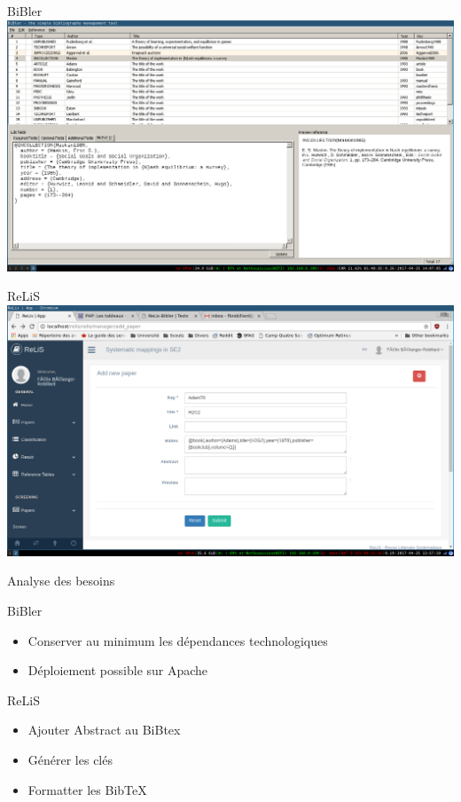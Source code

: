 \documentclass{beamer}
\begin{document}
\begin{frame}{BiBler}
\includegraphics[width=\linewidth,height=\textheight,keepaspectratio]{bibler.png}
\end{frame}

\begin{frame}{ReLiS}
\includegraphics[width=\linewidth,height=\textheight,keepaspectratio]{relis.png}
\end{frame}
\begin{frame}{Analyse des besoins}

\begin{block}{BiBler} 
\begin{itemize}
  \item Conserver au minimum les dépendances technologiques
  \item Déploiement possible sur Apache
\end{itemize}
\end{block}

\begin{block}{ReLiS} 
\begin{itemize}
  \item Ajouter Abstract au BiBtex
  \item Générer les clés
  \item Formatter les BibTeX
\end{itemize}
\end{block}


\end{frame}
\end{document}

